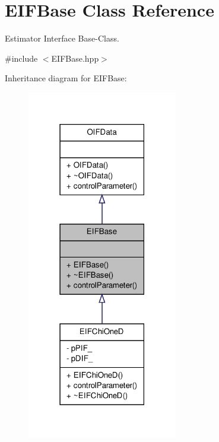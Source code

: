 \hypertarget{classEIFBase}{
\section{EIFBase Class Reference}
\label{df/d13/classEIFBase}
}


Estimator Interface Base-\/Class.  




{\ttfamily \#include $<$EIFBase.hpp$>$}



Inheritance diagram for EIFBase:\nopagebreak
\begin{figure}[H]
\begin{center}
\leavevmode
\includegraphics[width=186pt]{d7/d7a/classEIFBase__inherit__graph}
\end{center}
\end{figure}


